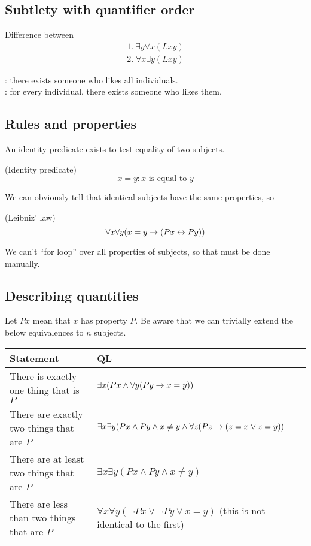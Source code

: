 \subsection{Subtlety with quantifier order}

Difference between
\begin{gather*}
    1.\;\exists y\forall x (Lxy)\\
    2.\;\forall x\exists y(Lxy)
\end{gather*}

: there exists someone who likes all individuals.\\
: for every individual, there exists someone who likes them. 

\subsection{Rules and properties}

An identity predicate exists to test equality of two subjects.

\begin{definition} (Identity predicate)
    $$x=y:\text{$x$ is equal to $y$}$$
\end{definition}

We can obviously tell that identical subjects have the same properties, so

\begin{definition} (Leibniz' law)
    $$\forall x\forall y(x=y\rightarrow (Px\leftrightarrow Py))$$
\end{definition}

We can't ``for loop'' over all properties of subjects, so that must be done manually.

\subsection{Describing quantities}

Let $Px$ mean that $x$ has property $P$. Be aware that we can trivially extend the below equivalences to $n$ subjects.

\begin{tabular}{l|l}
    Statement & QL\\
    \hline
    \hline
    There is exactly one thing that is $P$ & $\exists x(Px\land \forall y(Py\rightarrow x=y))$\\
    There are exactly two things that are $P$ & $\exists x\exists y(Px\land Py\land x\neq y\land \forall z(Pz\rightarrow (z=x\lor z=y))$\\
    There are at least two things that are $P$ & $\exists x\exists y(Px\land Py\land x\neq y)$\\
    There are less than two things that are $P$ & $\forall x\forall y(\lnot Px\lor \lnot Py\lor x=y)$ (this is not identical to the first)\\ 
\end{tabular}

